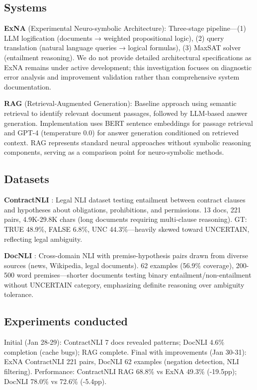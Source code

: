 \documentclass[12pt,a4paper]{article}
\begin{document}
\subsection{Systems}

\textbf{ExNA} (Experimental Neuro-symbolic Architecture): Three-stage pipeline—(1) LLM logification (documents → weighted propositional logic), (2) query translation (natural language queries → logical formulas), (3) MaxSAT solver (entailment reasoning). We do not provide detailed architectural specifications as ExNA remains under active development; this investigation focuses on diagnostic error analysis and improvement validation rather than comprehensive system documentation.

\noindent
\textbf{RAG} (Retrieval-Augmented Generation): Baseline approach using semantic retrieval to identify relevant document passages, followed by LLM-based answer generation. Implementation uses BERT sentence embeddings for passage retrieval and GPT-4 (temperature 0.0) for answer generation conditioned on retrieved context. RAG represents standard neural approaches without symbolic reasoning components, serving as a comparison point for neuro-symbolic methods.


\subsection{Datasets}

\textbf{ContractNLI} \cite{koreeda2021contractnli}: Legal NLI dataset testing entailment between contract clauses and hypotheses about obligations, prohibitions, and permissions. 13 docs, 221 pairs, 4.9K-29.8K chars (long documents requiring multi-clause reasoning). GT: TRUE 48.9\%, FALSE 6.8\%, UNC 44.3\%—heavily skewed toward UNCERTAIN, reflecting legal ambiguity.

\noindent
\textbf{DocNLI} \cite{yin2021docnli}: Cross-domain NLI with premise-hypothesis pairs drawn from diverse sources (news, Wikipedia, legal documents). 62 examples (56.9\% coverage), 200-500 word premises—shorter documents testing binary entailment/non-entailment without UNCERTAIN category, emphasizing definite reasoning over ambiguity tolerance.


\subsection{Experiments conducted}

Initial (Jan 28-29): ContractNLI 7 docs revealed patterns; DocNLI 4.6\% completion (cache bugs); RAG complete. Final with improvements (Jan 30-31): ExNA ContractNLI 221 pairs, DocNLI 62 examples (negation detection, NLI filtering). Performance: ContractNLI RAG 68.8\% vs ExNA 49.3\% (-19.5pp); DocNLI 78.0\% vs 72.6\% (-5.4pp).
\end{document}
